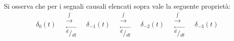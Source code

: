 Si osserva che per i segnali causali elencati sopra vale la seguente proprietà:
\[\delta_0(t) \quad \begin{array}{c} \stackrel{\int}{\longrightarrow} \\ \stackrel{\longleftarrow}{^d\!/\!_{dt}} \end{array} \quad
\delta_{-1}(t) \quad \begin{array}{c} \stackrel{\int}{\longrightarrow} \\ \stackrel{\longleftarrow}{^d\!/\!_{dt}} \end{array} \quad
\delta_{-2}(t) \quad \begin{array}{c} \stackrel{\int}{\longrightarrow} \\ \stackrel{\longleftarrow}{^d\!/\!_{dt}} \end{array} \quad
\delta_{-3}(t)\]

